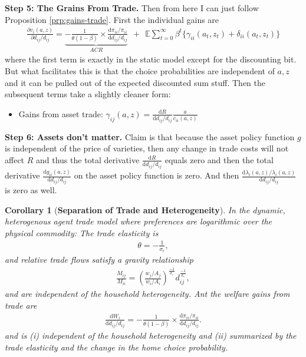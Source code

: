\documentclass[12pt,pdftex]{article}
\newtheorem{corr}{Corollary}
\begin{document}
\begin{onehalfspacing}
\textbf{Step 5: The Grains From Trade.} Then from here I can just follow Proposition \ref{prp:gains-trade}. First the individual gains are
{\footnotesize
\begin{align}
\nonumber
\frac{\partial v_i(a, z)}{\partial d_{ij} / d_{ij}} = \underbrace{-\frac{1}{\theta (1-\beta)} \times \frac{\mathrm{d} \pi_{ii} / \pi_{ii}}{\mathrm{d}d_{ij} / d_{ij}}}_{ACR} \ \ + \ \
\mathbb{E} \sum_{t = 0}^{\infty} \beta^{t} \bigg \{ \gamma_{ii}(a_{t},z_{t}) + \delta_{ii}(a_{t},z_{t}) \bigg \}
\end{align}
}where the first term is exactly in the static model except for the discounting bit. But what facilitates this is that the choice probabilities are independent of $a,z$ and it can be pulled out of the expected discounted sum stuff. Then the subsequent terms take a slightly cleaner form:
\begin{itemize}
\item Gains from asset trade: $\gamma_{ij}(a,z) = \frac{\mathrm{d} R}{\mathrm{d} d_{ij} / d_{ij}}\frac{a}{c_{ii}(a,z)}$
\end{itemize}

\textbf{Step 6: Assets don't matter.} Claim is that because the asset policy function $g$ is independent of the price of varieties, then any change in trade costs will not affect $R$ and thus the total derivative $\frac{\mathrm{d} R}{\mathrm{d} d_{ij} / d_{ij}}$ equals zero and then the total derivative $\frac{\mathrm{d} g_{ii}(a,z)}{\mathrm{d} d_{ij} / d_{ij}}$ on the asset policy function is zero. And then $\frac{\mathrm{d} \lambda_{i}(a,z)/ \lambda_{i}(a,z)}{\mathrm{d} d_{ij} / d_{ij}}$ is zero as well.

\begin{corr}[\textbf{Separation of Trade and Heterogeneity}] In the dynamic, heterogenous agent trade model where preferences are logarithmic over the physical commodity: The trade elasticity is
\begin{align}
\theta = -\frac{1}{\sigma_{\epsilon}}, \nonumber
\end{align}
and relative trade flows satisfy a gravity relationship
\begin{align}
\frac{M_{ij}}{M_{ii}} = \left( \frac{  w_{j} / A_{j} }{  w_{i} / A_{i} } \right)^{\frac{-1}{\sigma_{\epsilon}}} d_{ij}^{\frac{-1}{\sigma_{\epsilon}}}, \nonumber
\end{align}
and are independent of the household heterogeneity. Ant the welfare gains from trade are
\begin{align}
\frac{\mathrm{d} W_{i}}{\mathrm{d} d_{ij} / d_{ij}} = -\frac{1}{\theta (1-\beta)} \times \frac{\mathrm{d} \pi_{ii} / \pi_{ii}}{\mathrm{d}d_{ij} / d_{ij}}. \nonumber
\end{align}
and is (i) independent of the household heterogeneity and (ii) summarized by the trade elasticity and the change in the home choice probability.
\end{corr}


\end{onehalfspacing}
\end{document}
